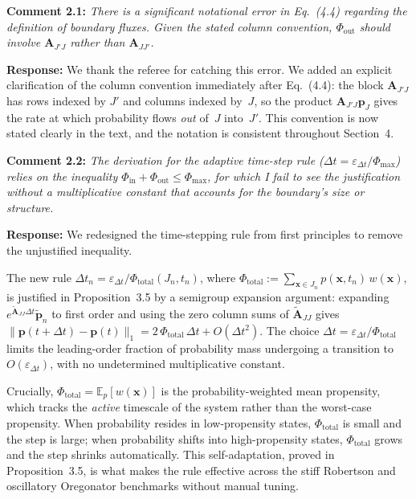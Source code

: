 \documentclass[11pt]{article}
\begin{document}
\noindent\textbf{Comment 2.1:} \textit{There is a significant notational error
in Eq.\ (4.4) regarding the definition of boundary fluxes. Given the stated
column convention, $\Phi_{\mathrm{out}}$ should involve $\mathbf{A}_{J'J}$
rather than $\mathbf{A}_{JJ'}$.}

\textbf{Response:} We thank the referee for catching this error.  We added an
explicit clarification of the column convention immediately after Eq.~(4.4):
the block $\mathbf{A}_{J'J}$ has rows indexed by $J'$ and columns indexed
by~$J$, so the product $\mathbf{A}_{J'J}\boldsymbol{p}_J$ gives the rate
at which probability flows \emph{out} of~$J$ into~$J'$. This convention is now
stated clearly in the text, and the notation is consistent throughout Section~4.

\medskip

\noindent\textbf{Comment 2.2:} \textit{The derivation for the adaptive
time-step rule ($\Delta t = \varepsilon_{\Delta t}/\Phi_{\max}$) relies on the
inequality $\Phi_{\mathrm{in}} + \Phi_{\mathrm{out}} \leq \Phi_{\max}$, for
which I fail to see the justification without a multiplicative constant that
accounts for the boundary's size or structure.}

\textbf{Response:} We redesigned the time-stepping
rule from first principles to remove the unjustified inequality.

The new rule $\Delta t_n = \varepsilon_{\Delta t}/\Phi_{\mathrm{total}}(J_n,t_n)$, where $\Phi_{\mathrm{total}} := \sum_{\boldsymbol{x}\in J_n}p(\boldsymbol{x},t_n)\,w(\boldsymbol{x})$, is justified in Proposition~3.5 by a semigroup expansion argument: expanding $e^{\widetilde{\mathbf{A}}_{JJ}\Delta t}\widetilde{\boldsymbol{p}}_n$ to first order and using the zero column sums of $\widetilde{\mathbf{A}}_{JJ}$ gives $\|\boldsymbol{p}(t+\Delta t)-\boldsymbol{p}(t)\|_1 = 2\,\Phi_{\mathrm{total}}\,\Delta t + O(\Delta t^2)$. The choice $\Delta t = \varepsilon_{\Delta t}/\Phi_{\mathrm{total}}$ limits the leading-order fraction of probability mass undergoing a transition to $O(\varepsilon_{\Delta t})$, with no undetermined multiplicative constant.

Crucially, $\Phi_{\mathrm{total}} = \mathbb{E}_p[w(\boldsymbol{x})]$ is the probability-weighted mean propensity, which tracks the \emph{active} timescale of the system rather than the worst-case propensity. When probability resides in low-propensity states, $\Phi_{\mathrm{total}}$ is small and the step is large; when probability shifts into high-propensity states, $\Phi_{\mathrm{total}}$ grows and the step shrinks automatically. This self-adaptation, proved in Proposition~3.5, is what makes the rule effective across the stiff Robertson and oscillatory Oregonator benchmarks without manual tuning.
\end{document}
